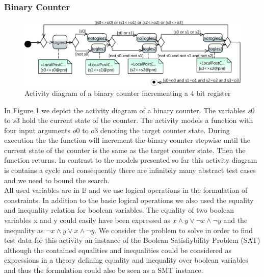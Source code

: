 \subsubsection{Binary Counter}
\begin{figure}
\includegraphics[width=\textwidth]{./pics/BinaryCounter.pdf}
\caption{Activity diagram of a binary counter incrementing a 4 bit register}
\label{fig:BinaryCounter}
\end{figure}
In Figure \ref{fig:BinaryCounter} we depict the activity diagram of a binary counter. The variables $s0$ to $s3$ hold the current state of the counter. The activity models a function with four input arguments $o0$ to $o3$ denoting the target counter state. During execution the the function will increment the binary counter stepwise until the current state of the counter is the same as the target counter state. Then the function returns. In contrast to the models presented so far this activity diagram is contains a cycle and consequently there are infinitely many abstract test cases and we need to bound the search.\\
All used variables are in $\mathbb{B}$ and we use logical operations in the formulation of constraints. In addition to the basic logical operations we also used the equality and inequality relation for boolean variables. The equality of two boolean variables x and y could easily have been expressed as $x \land y \lor \neg x \land \neg y$ and the inequality as $\neg x \land y \lor x \land \neg y$. We consider the problem to solve in order to find test data for this activity an instance of the Boolean Satisfiybility Problem (SAT) although the contained equalities and inequalities could be considered as expressions in a theory defining equality and inequality over boolean variables and thus the formulation could also be seen as a SMT instance.\\

